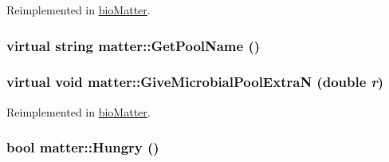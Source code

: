 Reimplemented in \hyperlink{classbio_matter_ab581ae32f84e6396b6c1057f70989333}{bioMatter}.\hypertarget{classmatter_ac2484214a3aecdc577de7dab86f0e48b}{
\subsubsection[{GetPoolName}]{\setlength{\rightskip}{0pt plus 5cm}virtual string matter::GetPoolName ()}}
\label{classmatter_ac2484214a3aecdc577de7dab86f0e48b}
\hypertarget{classmatter_ad4e8182423face98b556a4620437ade7}{
\subsubsection[{GiveMicrobialPoolExtraN}]{\setlength{\rightskip}{0pt plus 5cm}virtual void matter::GiveMicrobialPoolExtraN (double {\em r})}}
\label{classmatter_ad4e8182423face98b556a4620437ade7}


Reimplemented in \hyperlink{classbio_matter_aa3c39ebe46dac6e354b127c53bf94cb3}{bioMatter}.\hypertarget{classmatter_a59b4566b93dd22923b97976c752783ef}{
\subsubsection[{Hungry}]{\setlength{\rightskip}{0pt plus 5cm}bool matter::Hungry ()}}
\label{classmatter_a59b4566b93dd22923b97976c752783ef}


